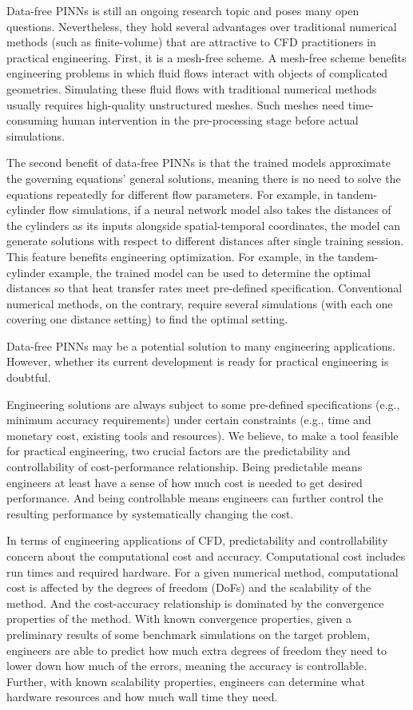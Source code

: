 
Data-free PINNs is still an ongoing research topic and poses many open questions.
Nevertheless, they hold several advantages over traditional numerical methods (such as finite-volume) that are attractive to CFD practitioners in practical engineering.
First, it is a mesh-free scheme.
A mesh-free scheme benefits engineering problems in which fluid flows interact with objects of complicated geometries.
Simulating these fluid flows with traditional numerical methods usually requires high-quality unstructured meshes.
Such meshes need time-consuming human intervention in the pre-processing stage before actual simulations.

The second benefit of data-free PINNs is that the trained models approximate the governing equations' general solutions, meaning there is no need to solve the equations repeatedly for different flow parameters.
For example, in tandem-cylinder flow simulations, if a neural network model also takes the distances of the cylinders as its inputs alongside spatial-temporal coordinates, the model can generate solutions with respect to different distances after single training session.
This feature benefits engineering optimization.
For example, in the tandem-cylinder example, the trained model can be used to determine the optimal distances so that heat transfer rates meet pre-defined specification.
Conventional numerical methods, on the contrary, require several simulations (with each one covering one distance setting) to find the optimal setting.

Data-free PINNs may be a potential solution to many engineering applications.
However, whether its current development is ready for practical engineering is doubtful.

Engineering solutions are always subject to some pre-defined specifications (e.g., minimum accuracy requirements) under certain constraints (e.g., time and monetary cost, existing tools and resources).
We believe, to make a tool feasible for practical engineering, two crucial factors are the predictability and controllability of cost-performance relationship. 
Being predictable means engineers at least have a sense of how much cost is needed to get desired performance.
And being controllable means engineers can further control the resulting performance by systematically changing the cost.

In terms of engineering applications of CFD, predictability and controllability concern about the computational cost and accuracy.
Computational cost includes run times and required hardware.
For a given numerical method, computational cost is affected by the degrees of freedom (DoFs) and the scalability of the method.
And the cost-accuracy relationship is dominated by the convergence properties of the method.
With known convergence properties, given a preliminary results of some benchmark simulations on the target problem, engineers are able to predict how much extra degrees of freedom they need to lower down how much of the errors, meaning the accuracy is controllable.
Further, with known scalability properties, engineers can determine what hardware resources and how much wall time they need.

